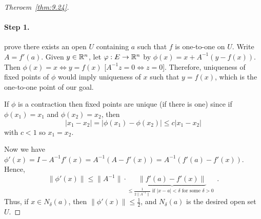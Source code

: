 \begin{proof}[Theroem~\ref{thm:9.24}]
	{\paragraph{Step 1.} prove there exists an open $U$ containing $a$ such that $f$ is one-to-one on $U$.
		Write $A=f'(a)$. Given $y \in \mathbb{R}^{n}$, let $\varphi:E\to \mathbb{R}^{n}$ by $\phi(x)=x+A^{-1}(y-f(x))$.
		Then $\phi(x)=x \Leftrightarrow y=f(x)$ [$A^{-1}z=0 \Leftrightarrow z=0$].
		Therefore, uniqueness of fixed points of $\phi$ would imply uniqueness of $x$ such that $y=f(x)$, which is the one-to-one point of our goal.}
	\begin{note}
		If $\phi$ is a contraction then fixed points are unique (if there is one) since if $\phi(x_{1})=x_{1}$ and $\phi(x_{2})=x_{2}$, then \[
			\left|x_{1}-x_{2}\right|=\left|\phi(x_{1})-\phi(x_{2})\right|\le c \left|x_{1}-x_{2}\right|
		\] with $c<1$ so $x_{1}=x_{2}$.
	\end{note}
	Now we have $\phi'(x)=I-A^{-1}f'(x)=A^{-1}(A-f'(x))=A^{-1}(f'(a) - f'(x))$.
	Hence, \[
		\|\phi'(x)\|\le \|A^{-1}\|\cdot \underbrace{\|f'(a)-f'(x)\|}_{\le \frac{1}{2 \|A^{-1}\|} \text{ if $\left|x-a\right|<\delta$ for some $\delta>0$ }} 
		.\]
	Thus, if $x \in N_{\delta}(a)$, then $\|\phi'(x)\|\le \frac{1}{2}$, and $N_\delta(a)$ is the desired open set $U$.
\end{proof}


